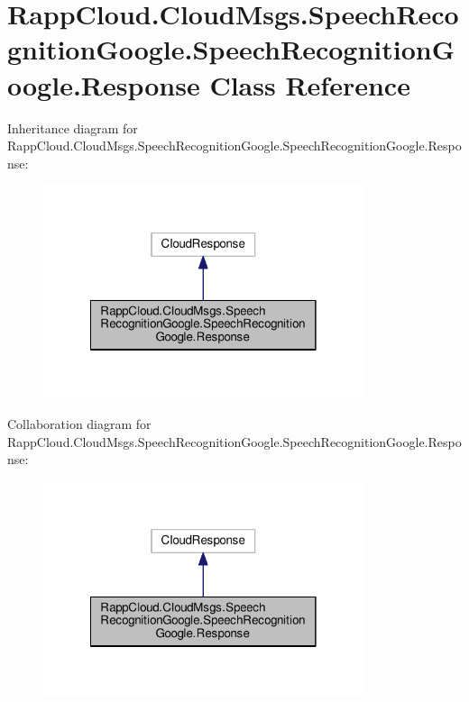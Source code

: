 \hypertarget{classRappCloud_1_1CloudMsgs_1_1SpeechRecognitionGoogle_1_1SpeechRecognitionGoogle_1_1Response}{\section{Rapp\-Cloud.\-Cloud\-Msgs.\-Speech\-Recognition\-Google.\-Speech\-Recognition\-Google.\-Response Class Reference}
\label{classRappCloud_1_1CloudMsgs_1_1SpeechRecognitionGoogle_1_1SpeechRecognitionGoogle_1_1Response}
}


Inheritance diagram for Rapp\-Cloud.\-Cloud\-Msgs.\-Speech\-Recognition\-Google.\-Speech\-Recognition\-Google.\-Response\-:
\nopagebreak
\begin{figure}[H]
\begin{center}
\leavevmode
\includegraphics[width=266pt]{classRappCloud_1_1CloudMsgs_1_1SpeechRecognitionGoogle_1_1SpeechRecognitionGoogle_1_1Response__inherit__graph}
\end{center}
\end{figure}


Collaboration diagram for Rapp\-Cloud.\-Cloud\-Msgs.\-Speech\-Recognition\-Google.\-Speech\-Recognition\-Google.\-Response\-:
\nopagebreak
\begin{figure}[H]
\begin{center}
\leavevmode
\includegraphics[width=266pt]{classRappCloud_1_1CloudMsgs_1_1SpeechRecognitionGoogle_1_1SpeechRecognitionGoogle_1_1Response__coll__graph}
\end{center}
\end{figure}
